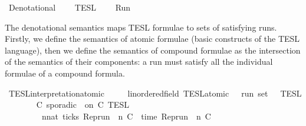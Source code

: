 %
\begin{isabellebody}%
%
%
\isadelimdocument
%
\endisadelimdocument
%
\isatagdocument
%
\isamarkuptrue%
%
\endisatagdocument
{\isafolddocument}%
%
\isadelimdocument
%
\endisadelimdocument
%
\isadelimtheory
%
\endisadelimtheory
%
\isatagtheory
{}\isamarkupfalse%
\ Denotational\isanewline
{}\isanewline
\ \ \ \ TESL\isanewline
\ \ \ \ Run\isanewline
\isanewline
{}%
\endisatagtheory
{\isafoldtheory}%
%
\isadelimtheory
%
\endisadelimtheory
%
\begin{isamarkuptext}%
The denotational semantics maps TESL formulae to sets of satisfying runs.
  Firstly, we define the semantics of atomic formulae (basic constructs of the 
  TESL language), then we define the semantics of compound formulae as the
  intersection of the semantics of their components: a run must satisfy all
  the individual formulae of a compound formula.%
\end{isamarkuptext}\isamarkuptrue%
%
\isadelimdocument
%
\endisadelimdocument
%
\isatagdocument
%
\isamarkuptrue%
%
\endisatagdocument
{\isafolddocument}%
%
\isadelimdocument
%
\endisadelimdocument
\isanewline
{}\isamarkupfalse%
\ TESL{\isacharunderscore}interpretation{\isacharunderscore}atomic\isanewline
\ \ \ \ {\isacharcolon}{\isacharcolon}\ {\isacartoucheopen}{\isacharparenleft}{\isacharprime}{\isasymtau}{\isacharcolon}{\isacharcolon}linordered{\isacharunderscore}field{\isacharparenright}\ TESL{\isacharunderscore}atomic\ {\isasymRightarrow}\ {\isacharprime}{\isasymtau}\ run\ set{\isacartoucheclose}\ {\isacharparenleft}{\isacartoucheopen}{\isasymlbrakk}\ {\isacharunderscore}\ {\isasymrbrakk}\isactrlsub T\isactrlsub E\isactrlsub S\isactrlsub L{\isacartoucheclose}{\isacharparenright}\isanewline
{}\isanewline
\ \ %
\isanewline
\ \ \ \ {\isacartoucheopen}{\isasymlbrakk}\ C\ sporadic\ {\isasymtau}\ on\ C\ {\isasymrbrakk}\isactrlsub T\isactrlsub E\isactrlsub S\isactrlsub L\ {\isacharequal}\isanewline
\ \ \ \ \ \ \ \ {\isacharbraceleft}{\isasymrho}{\isachardot}\ {\isasymexists}n{\isacharcolon}{\isacharcolon}nat{\isachardot}\ ticks\ {\isacharparenleft}{\isacharparenleft}Rep{\isacharunderscore}run\ {\isasymrho}{\isacharparenright}\ n\ C\ {\isasymand}\ time\ {\isacharparenleft}{\isacharparenleft}Rep{\isacharunderscore}run\ {\isasymrho}{\isacharparenright}\ n\ C\ {\isacharequal}\ {\isasymtau}{\isacharbraceright}{\isacartoucheclose}\isanewline

\end{isabellebody}
